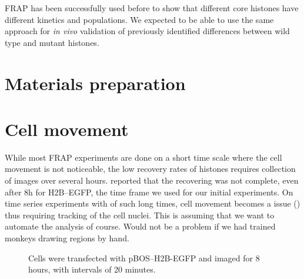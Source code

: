   FRAP has been successfully used before to show that different core histones have
  different kinetics and populations. We expected to be able to use the same approach
  for \textit{in vivo} validation of previously identified differences between
  wild type and mutant histones.


\section{Materials preparation}

\section{Cell movement}

  While most FRAP experiments are done on a short time scale where the cell movement
  is not noticeable, the low recovery rates of histones requires collection of images
  over several hours.  reported that the recovering was not
  complete, even after 8h for H2B--EGFP, the time frame we used for our initial experiments.
  On time series experiments with of such long
  times, cell movement becomes a issue () thus requiring tracking
  of the cell nuclei. This is assuming that we want to automate the analysis of course.
  Would not be a problem if we had trained monkeys drawing regions by hand.
  
  \begin{figure}
    \centering
                 {Cells were transfected with pBOS--H2B-EGFP and imaged for 8
                  hours, with intervals of 20 minutes.}
    \label{fig:cell-movement}
  \end{figure}
  
